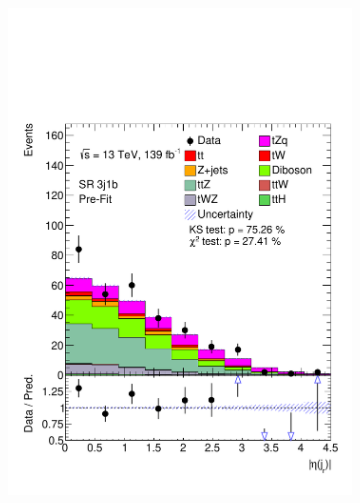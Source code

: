 \begin{figure}[!h]
\begin{subfigure}[b]{0.33\linewidth}
    \includegraphics[width=\linewidth]{ubonn-thesis/Chapters/Chapters_06/Figure/Input_distribution/SR_3j1b_etajf.pdf} 
  \end{subfigure}
  \begin{subfigure}[b]{0.33\linewidth}
    \centering

\end{subfigure}
\end{figure}
